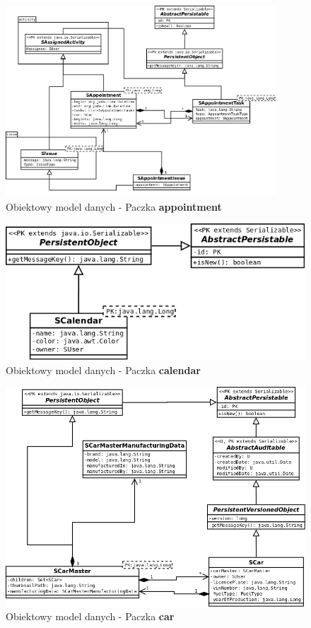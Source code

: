 	\begin{figure}[H]
		\centering
		\includegraphics[width=0.9\textwidth]{images/umls/appointment}
		\caption[Obiektowy model danych - Paczka \textbf{appointment}]{
			Obiektowy model danych - Paczka \textbf{appointment}
		}
		\label{app:schema_appointment_package}
	\end{figure}
	\begin{figure}[H]
		\centering
		\includegraphics[width=1.0\textwidth]{images/umls/calendar}
		\caption[Obiektowy model danych - Paczka \textbf{calendar}]{
			Obiektowy model danych - Paczka \textbf{calendar}
		}
		\label{app:schema_calendar_package}
	\end{figure}
	\begin{figure}[H]
		\centering
		\includegraphics[width=1.0\textwidth]{images/umls/car}
		\caption[Obiektowy model danych - Paczka \textbf{car}]{
			Obiektowy model danych - Paczka \textbf{car}
		}
		\label{app:schema_car_package}
	\end{figure}
